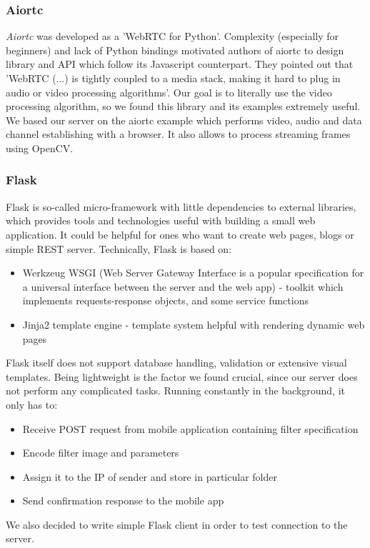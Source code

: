 \documentclass[../Main.tex]{subfiles}
\begin{document}
    \subsubsection{Aiortc}
    \textit{Aiortc} was developed as a 'WebRTC for Python'. Complexity (especially for beginners) and lack of Python bindings motivated authors of aiortc to design library and API which follow its Javascript counterpart. They pointed out that 
    'WebRTC (...) is tightly coupled to a media stack, making it hard to plug in audio or video processing algorithms'. Our goal is to literally use the video processing algorithm, so we found this library and its examples extremely useful.
    We based our server on the aiortc example which performs video, audio and data channel establishing with a browser. It also allows to process streaming frames using OpenCV. 
    
    \subsubsection{Flask}
    Flask is so-called micro-framework with little dependencies to external libraries, which provides tools and technologies useful with building a small web application. It could be helpful for ones who want to create web pages, blogs or simple REST server. 
    Technically, Flask is based on:
    \begin{itemize}
    \item Werkzeug WSGI (Web Server Gateway Interface is a popular specification for a universal interface between the  server and the web app) - toolkit which implements requests-response objects, and some service functions
    \item Jinja2 template engine - template system helpful with rendering dynamic web pages
    \end{itemize}
    Flask itself does not support database handling, validation or extensive visual templates. Being lightweight is the factor we found crucial, since our server does not perform any complicated tasks. Running constantly in the background, it only has to:
    \begin{itemize}
    \item Receive POST request from mobile application containing filter specification 
    \item Encode filter image and parameters
    \item Assign it to the IP of sender and store in particular folder
    \item Send confirmation response to the mobile app
    \end{itemize}
    We also decided to write simple Flask client in order to test connection to the server.
    
\end{document}
